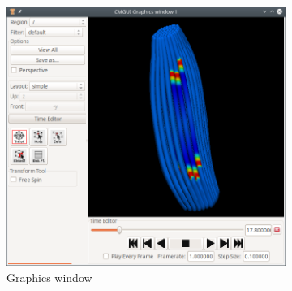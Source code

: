 \begin{figure}%
  \centering%
  \begin{subfigure}[t]{0.62\textwidth}%
    \centering%
    \includegraphics[width=\textwidth]{images/implementation/cmgui_graphics1.png}
    \caption{Graphics window}%
    \label{fig:current_configuration_1}%
  \end{subfigure}
  \begin{subfigure}[t]{0.363\textwidth}%
    \centering%

\end{subfigure}
\end{figure}
